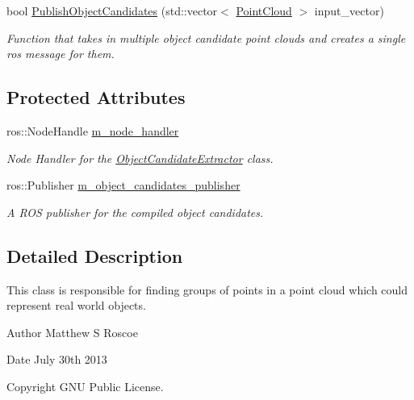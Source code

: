 \begin{DoxyCompactItemize}
\item 
bool \hyperlink{class_object_candidate_extractor_ab8848f6d86f7d7798ea30c2e04ae8b59}{\-Publish\-Object\-Candidates} (std\-::vector$<$ \hyperlink{_helper_functions_8h_abb956d1047f4dd2c956fe3cb0dd0004d}{\-Point\-Cloud} $>$ input\-\_\-vector)
\begin{DoxyCompactList}\small\item\em \-Function that takes in multiple object candidate point clouds and creates a single ros message for them. \end{DoxyCompactList}\end{DoxyCompactItemize}
\subsection*{\-Protected \-Attributes}
\begin{DoxyCompactItemize}
\item 
ros\-::\-Node\-Handle \hyperlink{class_object_candidate_extractor_a9a0da45687232f96360f76175a3cb097}{m\-\_\-node\-\_\-handler}
\begin{DoxyCompactList}\small\item\em \-Node \-Handler for the \hyperlink{class_object_candidate_extractor}{\-Object\-Candidate\-Extractor} class. \end{DoxyCompactList}\item 
ros\-::\-Publisher \hyperlink{class_object_candidate_extractor_a3b5cd0451266eafe0aba2d950a7434e8}{m\-\_\-object\-\_\-candidates\-\_\-publisher}
\begin{DoxyCompactList}\small\item\em \-A \-R\-O\-S publisher for the compiled object candidates. \end{DoxyCompactList}\end{DoxyCompactItemize}


\subsection{\-Detailed \-Description}
\-This class is responsible for finding groups of points in a point cloud which could represent real world objects. 

\begin{DoxyAuthor}{\-Author}
\-Matthew \-S \-Roscoe 
\end{DoxyAuthor}
\begin{DoxyDate}{\-Date}
\-July 30th 2013 
\end{DoxyDate}
\begin{DoxyCopyright}{\-Copyright}
\-G\-N\-U \-Public \-License. 
\end{DoxyCopyright}



